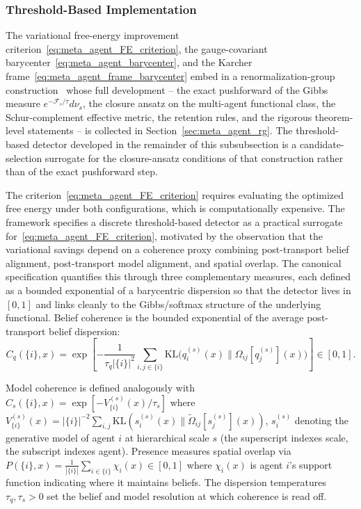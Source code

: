 \documentclass[11pt]{article}
\begin{document}
\subsubsection{Threshold-Based Implementation}
\label{sec:meta_agent_threshold}

The variational free-energy improvement criterion~\eqref{eq:meta_agent_FE_criterion}, the gauge-covariant barycenter~\eqref{eq:meta_agent_barycenter}, and the Karcher frame~\eqref{eq:meta_agent_frame_barycenter} embed in a renormalization-group construction~\cite{Wilson1971, Cardy1996} whose full development -- the exact pushforward of the Gibbs measure $e^{-\mathcal{F}_s/\tau} d\nu_s$, the closure ansatz on the multi-agent functional class, the Schur-complement effective metric, the retention rules, and the rigorous theorem-level statements -- is collected in Section~\ref{sec:meta_agent_rg}. The threshold-based detector developed in the remainder of this subsubsection is a candidate-selection surrogate for the closure-ansatz conditions of that construction rather than of the exact pushforward step.

The criterion~\eqref{eq:meta_agent_FE_criterion} requires evaluating the optimized free energy under both configurations, which is computationally expensive. The framework specifies a discrete threshold-based detector as a practical surrogate for~\eqref{eq:meta_agent_FE_criterion}, motivated by the observation that the variational savings depend on a coherence proxy combining post-transport belief alignment, post-transport model alignment, and spatial overlap. The canonical specification quantifies this through three complementary measures, each defined as a bounded exponential of a barycentric dispersion so that the detector lives in $[0, 1]$ and links cleanly to the Gibbs/softmax structure of the underlying functional. Belief coherence is the bounded exponential of the average post-transport belief dispersion:
\begin{equation}
C_q(\{i\}, x) = \exp\left[-\frac{1}{\tau_q |\{i\}|^2}\sum_{i,j \in \{i\}} \mathrm{KL}\big(q_i^{(s)}(x) \| \Omega_{ij}[q_j^{(s)}](x)\big)\right] \in [0, 1].
\end{equation}

Model coherence is defined analogously with $C_s(\{i\}, x) = \exp[-V^{(s)}_{\{i\}}(x)/\tau_s]$ where $V^{(s)}_{\{i\}}(x) = |\{i\}|^{-2}\sum_{i,j} \mathrm{KL}(s_i^{(s)}(x) \| \tilde{\Omega}_{ij}[s_j^{(s)}](x))$, $s_i^{(s)}$ denoting the generative model of agent $i$ at hierarchical scale $s$ (the superscript indexes scale, the subscript indexes agent). Presence measures spatial overlap via $P(\{i\}, x) = \frac{1}{|\{i\}|}\sum_{i \in \{i\}} \chi_i(x) \in [0, 1]$ where $\chi_i(x)$ is agent $i$'s support function indicating where it maintains beliefs. The dispersion temperatures $\tau_q, \tau_s > 0$ set the belief and model resolution at which coherence is read off.
\end{document}
